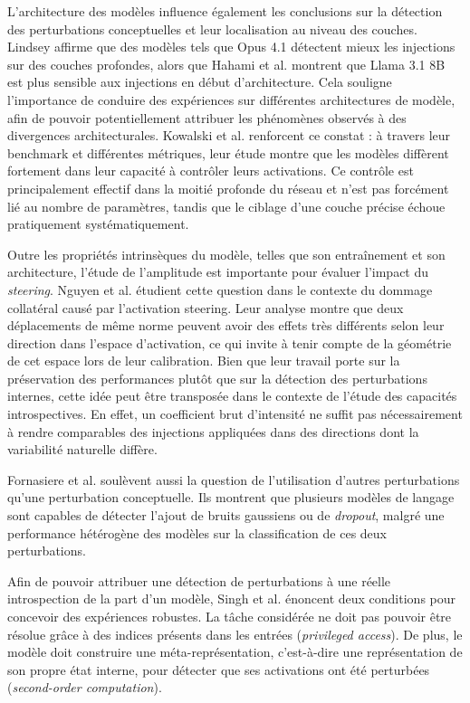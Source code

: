 \documentclass[10pt,a4paper]{article}
\begin{document}
L'architecture des modèles influence également les conclusions sur la détection des perturbations conceptuelles et leur localisation au niveau des couches. Lindsey \cite{lindsey2026} affirme que des modèles tels que Opus 4.1 détectent mieux les injections sur des couches profondes, alors que Hahami et al. \cite{hahami2026} montrent que Llama 3.1 8B est plus sensible aux injections en début d'architecture. Cela souligne l'importance de conduire des expériences sur différentes architectures de modèle, afin de pouvoir potentiellement attribuer les phénomènes observés à des divergences architecturales. Kowalski et al. \cite{kowalski2026} renforcent ce constat : à travers leur benchmark et différentes métriques, leur étude montre que les modèles diffèrent fortement dans leur capacité à contrôler leurs activations. Ce contrôle est principalement effectif dans la moitié profonde du réseau et n'est pas forcément lié au nombre de paramètres, tandis que le ciblage d'une couche précise échoue pratiquement systématiquement.

Outre les propriétés intrinsèques du modèle, telles que son entraînement et son architecture, l'étude de l'amplitude est importante pour évaluer l'impact du \emph{steering}. Nguyen et al. \cite{nguyen2026} étudient cette question dans le contexte du dommage collatéral causé par l'activation steering. Leur analyse montre que deux déplacements de même norme peuvent avoir des effets très différents selon leur direction dans l'espace d'activation, ce qui invite à tenir compte de la géométrie de cet espace lors de leur calibration. Bien que leur travail porte sur la préservation des performances plutôt que sur la détection des perturbations internes, cette idée peut être transposée dans le contexte de l'étude des capacités introspectives. En effet, un coefficient brut d'intensité ne suffit pas nécessairement à rendre comparables des injections appliquées dans des directions dont la variabilité naturelle diffère.

Fornasiere et al. \cite{fornasiere2026} soulèvent aussi la question de l'utilisation d'autres perturbations qu'une perturbation conceptuelle. Ils montrent que plusieurs modèles de langage sont capables de détecter l'ajout de bruits gaussiens ou de \emph{dropout}, malgré une performance hétérogène des modèles sur la classification de ces deux perturbations.

Afin de pouvoir attribuer une détection de perturbations à une réelle introspection de la part d'un modèle, Singh et al. \cite{singh2026} énoncent deux conditions pour concevoir des expériences robustes. La tâche considérée ne doit pas pouvoir être résolue grâce à des indices présents dans les entrées (\emph{privileged access}). De plus, le modèle doit construire une méta-représentation, c'est-à-dire une représentation de son propre état interne, pour détecter que ses activations ont été perturbées (\emph{second-order computation}).
\end{document}
